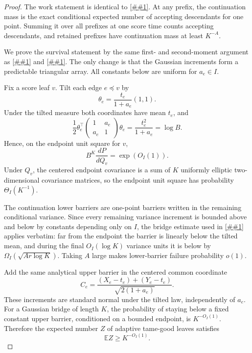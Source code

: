 \documentclass[10pt]{article}
\newcommand{\cref}[1]{\ref{##1}}
\theoremstyle{definition}
\newcommand{\E}{\mathbb{E}}
\begin{document}
\begin{proof}
   The work statement is identical to \cref{lem:continuation-work}. At any prefix, the continuation mass is the exact conditional expected number of accepting descendants for one point. Summing it over all prefixes at one score time counts accepting descendants, and retained prefixes have continuation mass at least $K^{-A}$.

   We prove the survival statement by the same first- and second-moment argument as \cref{lem:good-first-moment} and \cref{lem:tame-second-moment}. The only change is that the Gaussian increments form a predictable triangular array. All constants below are uniform for $a_e\in I$.

   Fix a score leaf $v$. Tilt each edge $e\preceq v$ by
   \[
      \theta_e=\frac{t_e}{1+a_e}(1,1).
   \]
   Under the tilted measure both coordinates have mean $t_e$, and
   \[
      \frac12\theta_e^\top
      \begin{pmatrix}1&a_e\\ a_e&1\end{pmatrix}
      \theta_e
      =
      \frac{t_e^2}{1+a_e}
      =
      \log B.
   \]
   Hence, on the endpoint unit square for $v$,
   \[
      B^K\frac{dP}{dQ_v}=\exp(O_I(1)).
   \]
   Under $Q_v$, the centered endpoint covariance is a sum of $K$ uniformly elliptic two-dimensional covariance matrices, so the endpoint unit square has probability $\Theta_I(K^{-1})$.

   The continuation lower barriers are one-point barriers written in the remaining conditional variance. Since every remaining variance increment is bounded above and below by constants depending only on $I$, the bridge estimate used in \cref{lem:good-first-moment} applies verbatim: far from the endpoint the barrier is linearly below the tilted mean, and during the final $O_I(\log K)$ variance units it is below by $\Omega_I(\sqrt{A r\log K})$. Taking $A$ large makes lower-barrier failure probability $o(1)$.

   Add the same analytical upper barrier in the centered common coordinate
   \[
      C_e=\frac{(X_e-t_e)+(Y_e-t_e)}{\sqrt{2(1+a_e)}}.
   \]
   These increments are standard normal under the tilted law, independently of $a_e$. For a Gaussian bridge of length $K$, the probability of staying below a fixed constant upper barrier, conditioned on a bounded endpoint, is $K^{-O_I(1)}$. Therefore the expected number $Z$ of adaptive tame-good leaves satisfies
   \[
      \E Z\ge K^{-O_I(1)}.
   \]


\end{proof}
\end{document}
